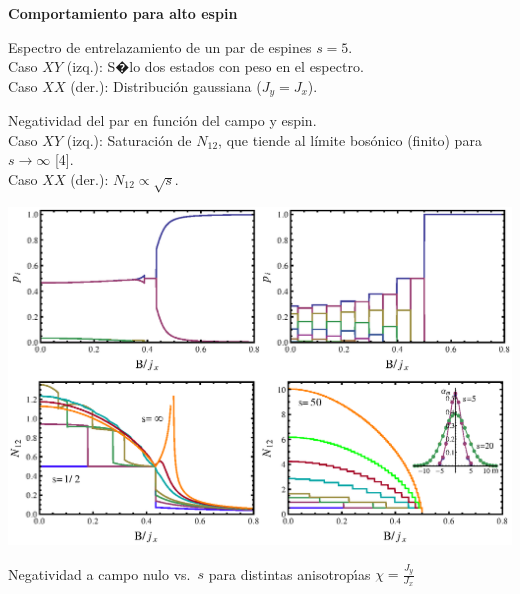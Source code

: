 \documentclass[a0paper,portrait]{baposter}
\begin{document}
\begin{poster}
{{\bf Comportamiento para alto espin }\\

\begin{minipage}{8.75cm} Espectro de entrelazamiento de un par de espines  $s=5$.\\
Caso {\color{blue} $XY$} (izq.):  S�lo dos estados con peso en el espectro.\\
Caso {\color{red} $XX$} (der.):  Distribuci\'on gaussiana  ($J_y=J_x$).
\vspace*{0.5cm}

Negatividad del par en funci\'on del campo  y  espin.\\
Caso {\color{blue} $XY$} (izq.): Saturaci\'on de $N_{12}$, que tiende al l\'imite bos\'onico  (finito) para $s\rightarrow\infty$ [4]. \\
Caso {\color{red} $XX$} (der.): {\color{red} $N_{12}\propto \sqrt{s}$.}
\end{minipage}
\vspace*{-5.4cm}




\hspace*{8.35cm}
\includegraphics*[scale=.35]{fig7}\hspace*{-3cm}
\vspace{-3.8cm}

Negatividad a campo nulo vs.\  $s$
para distintas anisotrop\'{\i}as {\color{blue}$\chi=\frac{J_y}{J_x}$}
\vspace*{-8.05cm}

}
\end{poster}
\end{document}
